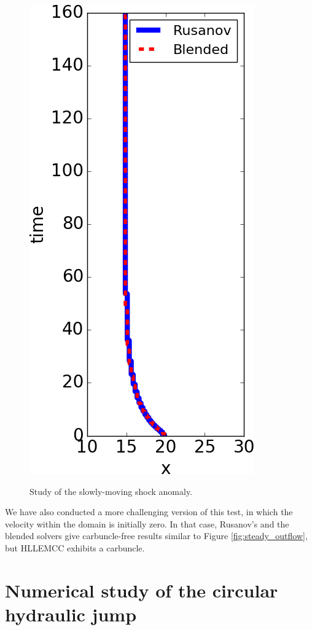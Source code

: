 \documentclass[preprint, 11pt]{article}
\begin{document}
\begin{figure}[!h]
{    \includegraphics[scale=0.475,valign=c]{figures/pos_shock.png}}
  \caption{Study of the slowly-moving shock anomaly. \label{fig:slowly_moving_anomaly}}
\end{figure}

We have also conducted a more challenging version of this test, in which
the velocity within the domain is initially zero.  In that case, Rusanov's 
and the blended solvers give carbuncle-free results similar to Figure \ref{fig:steady_outflow},
but HLLEMCC exhibits a carbuncle.

\section{Numerical study of the circular hydraulic jump}\label{sec:chj}
\end{document}
